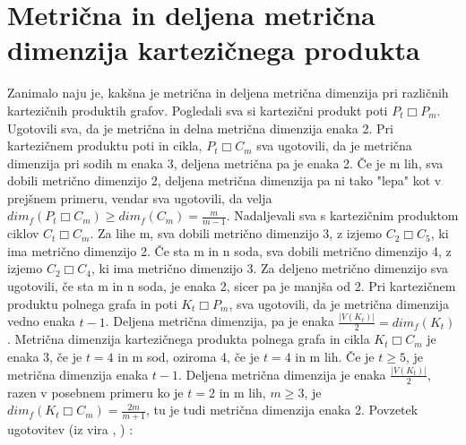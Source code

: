 \documentclass[a4paper]{report}
\begin{document}
	\section*{Metrična in deljena metrična dimenzija kartezičnega produkta}
	
	Zanimalo naju je, kakšna je metrična in deljena metrična dimenzija pri različnih kartezičnih produktih grafov. Pogledali sva si kartezični produkt poti $P_{t}\Box P_{m}$. Ugotovili sva, da je metrična in delna metrična dimenzija enaka 2. Pri kartezičnem produktu poti in cikla, $P_{t}\Box C_{m}$ sva ugotovili, da je metrična dimenzija pri sodih m enaka 3, deljena metrična pa je enaka 2. Če je m lih, sva dobili metrično dimenzijo 2, deljena metrična dimenzija pa ni tako "lepa" kot v prejšnem primeru, vendar sva ugotovili, da velja  $dim_{f}( P_{t}\Box C_{m})\ge dim_{f}(C_{m})= \frac{m}{m-1}$.
	Nadaljevali sva s kartezičnim produktom ciklov $C_{t}\Box C_{m}$. 
	Za lihe m, sva dobili metrično dimenzijo 3, z izjemo $C_{2}\Box C_{5}$, ki ima metrično dimenzijo 2. Če sta m in n soda, sva dobili metrično dimenzijo 4, z izjemo $C_{2}\Box C_{4}$, ki ima metrično dimenzijo 3. Za deljeno metrično dimenzijo sva ugotovili, če sta m in n soda, je enaka 2, sicer pa je manjša od 2. Pri kartezičnem produktu polnega grafa in poti $K_{t}\Box P_{m}$, sva ugotovili, da je metrična dimenzija vedno enaka $t-1$. Deljena metrična dimenzija, pa je enaka $\frac{|V(K_{t})|}{2} = dim_{f}(K_{t})$. Metrična dimenzija kartezičnega produkta polnega grafa in cikla $K_{t}\Box C_{m}$ je enaka 3, če je $t = 4$ in m sod, oziroma 4, če je $t = 4$ in m lih. Če je $t \ge 5$, je metrična dimenzija enaka $t-1$. Deljena metrična dimenzija je enaka $\frac{|V(K_{t})|}{2}$, razen v posebnem primeru ko je $t = 2$ in m lih, $m \ge 3 $, je $dim_f(K_{t}\Box C_{m}) = \frac{2m}{m+1}$, tu je tudi metrična dimenzija enaka 2.
	Povzetek ugotovitev (iz vira \cite{4}, \cite{5}) : 
	\\
\end{document}
